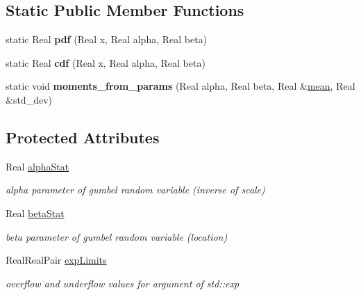 \subsection*{Static Public Member Functions}
\begin{DoxyCompactItemize}
\item 
static Real {\bfseries pdf} (Real x, Real alpha, Real beta)\label{classPecos_1_1GumbelRandomVariable_a739d94cef9ee188f00056e229ca3fd95}

\item 
static Real {\bfseries cdf} (Real x, Real alpha, Real beta)\label{classPecos_1_1GumbelRandomVariable_a6ccc276bca2bfdfd6f320c65a6c8aaf7}

\item 
static void {\bfseries moments\+\_\+from\+\_\+params} (Real alpha, Real beta, Real \&\hyperlink{classPecos_1_1GumbelRandomVariable_a962ffe5a3593be370d5c883365c060f4}{mean}, Real \&std\+\_\+dev)\label{classPecos_1_1GumbelRandomVariable_af6459b831a8e62a41f7eab34d06edad8}

\end{DoxyCompactItemize}
\subsection*{Protected Attributes}
\begin{DoxyCompactItemize}
\item 
Real \hyperlink{classPecos_1_1GumbelRandomVariable_aa48da95b9214d9cf933e1d4625e32e84}{alpha\+Stat}\label{classPecos_1_1GumbelRandomVariable_aa48da95b9214d9cf933e1d4625e32e84}

\begin{DoxyCompactList}\small\item\em alpha parameter of gumbel random variable (inverse of scale) \end{DoxyCompactList}\item 
Real \hyperlink{classPecos_1_1GumbelRandomVariable_a838d220373c3360feec45e853b0daaac}{beta\+Stat}\label{classPecos_1_1GumbelRandomVariable_a838d220373c3360feec45e853b0daaac}

\begin{DoxyCompactList}\small\item\em beta parameter of gumbel random variable (location) \end{DoxyCompactList}\item 
Real\+Real\+Pair \hyperlink{classPecos_1_1GumbelRandomVariable_a019c4aba39508814cfdb412f6aef51c8}{exp\+Limits}\label{classPecos_1_1GumbelRandomVariable_a019c4aba39508814cfdb412f6aef51c8}

\begin{DoxyCompactList}\small\item\em overflow and underflow values for argument of std\+::exp \end{DoxyCompactList}\end{DoxyCompactItemize}
